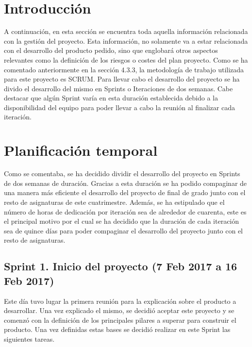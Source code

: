 
\section{Introducción}

A continuación, en esta sección se encuentra toda aquella información relacionada con la gestión del proyecto. Esta información, no solamente va a estar relacionada con el desarrollo del producto pedido, sino que englobará otros aspectos relevantes como la definición de los riesgos o costes del plan proyecto.
Como se ha comentado anteriormente en la sección 4.3.3, la metodología de trabajo utilizada para este proyecto es SCRUM. Para llevar cabo el desarrollo del proyecto se ha divido el desarrollo del mismo en Sprints o Iteraciones de dos semanas. Cabe destacar que algún Sprint varía en esta duración establecida debido a la disponibilidad del equipo para poder llevar a cabo la reunión al finalizar cada iteración.


\section{Planificación temporal}

Como se comentaba, se ha decidido dividir el desarrollo del proyecto en Sprints de dos semanas de duración. Gracias a esta duración se ha podido compaginar de una manera más eficiente el desarrollo del proyecto de final de grado junto con el resto de asignaturas de este cuatrimestre. Además, se ha estipulado que el número de horas de dedicación por iteración sea de alrededor de cuarenta, este es el principal motivo por el cual se ha decidido que la duración de cada iteración sea de quince días para poder compaginar el desarrollo del proyecto junto con el resto de asignaturas.

\subsection{Sprint 1. Inicio del proyecto (7 Feb 2017 a 16 Feb 2017)}

Este día tuvo lugar la primera reunión para la explicación sobre el producto a desarrollar. Una vez explicado el mismo, se decidió aceptar este proyecto y se comenzó con la definición de los principales pilares a superar para construir el producto. Una vez definidas estas bases se decidió realizar en este Sprint las siguientes tareas.

